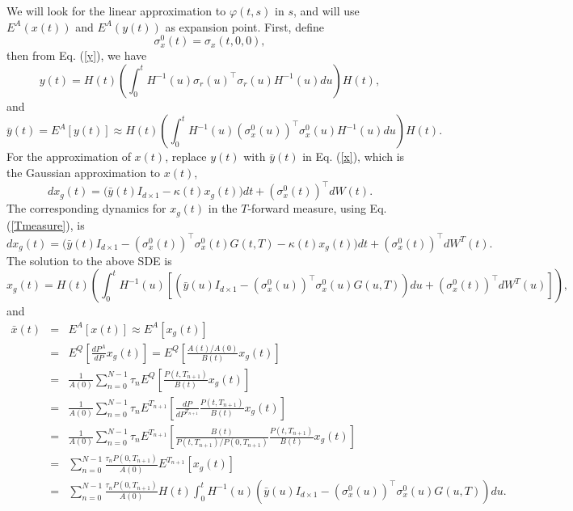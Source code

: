 \documentclass[12pt]{article}
\begin{document}
    We will look for the linear approximation to $\varphi(t,s)$ in $s$, and will use $E^A(x(t))$ and $E^A(y(t))$
    as expansion point. First, define
    \begin{equation}
      \sigma_x^0(t)=\sigma_x(t,0,0),
    \end{equation}
    then from Eq. (\ref{y}), we have
    \begin{equation}
      y(t)=H(t)\left(\int_0^tH^{-1}(u)\sigma_r(u)^{\top}\sigma_r(u)H^{-1}(u)du\right)H(t),
    \end{equation}
    and
    \begin{equation}
      \bar{y}(t)= E^A\left[y(t)\right] \approx H(t)\left(\int_0^tH^{-1}(u)\left(\sigma_x^0(u)\right)^{\top}\sigma_x^0(u)H^{-1}(u)du\right)H(t).
    \end{equation}
    For the approximation of $x(t)$, replace $y(t)$ with $\bar{y}(t)$ in Eq. (\ref{x}), which is the Gaussian approximation
    to $x(t)$,
    \begin{equation}
      dx_g(t)=\bigg(\bar{y}(t)I_{d \times 1}-\kappa(t)x_g(t)\bigg)dt+\left(\sigma_x^0(t)\right)^{\top}dW(t).
    \end{equation}
    The corresponding dynamics for $x_g(t)$ in the $T$-forward measure, using Eq. (\ref{Tmeasure}), is
    \begin{equation}
      dx_g(t)=\bigg(\bar{y}(t)I_{d \times 1}-\left(\sigma_x^0(t)\right)^{\top}\sigma_x^0(t)G(t,T)-\kappa(t)x_g(t)\bigg)dt
                                        +\left(\sigma_x^0(t)\right)^{\top}dW^T(t).
    \end{equation}
    The solution to the above SDE is
    \begin{equation}
      x_g(t)=H(t)\left(\int_0^tH^{-1}(u)\left[\left(\bar{y}(u)I_{d \times 1}-\left(\sigma_x^0(u)\right)^{\top}\sigma_x^0(u)G(u,T)\right)du
                        +\left(\sigma_x^0(t)\right)^{\top}dW^T(u)\right]\right),
    \end{equation}
    and
    \begin{eqnarray}
      \bar{x}(t) &=& E^A\left[x(t)\right]\approx E^A\left[x_g(t)\right]\nonumber\\
                 &=& E^Q\left[\frac{dP^A}{dP}x_g(t)\right] = E^Q\left[\frac{A(t)/A(0)}{B(t)}x_g(t)\right]\nonumber\\
                 &=& \frac{1}{A(0)}\sum_{n=0}^{N-1}\tau_n E^Q\left[\frac{P(t,T_{n+1})}{B(t)}x_g(t)\right]\nonumber\\
                 &=& \frac{1}{A(0)}\sum_{n=0}^{N-1}\tau_n E^{T_{n+1}}\left[\frac{dP}{dP^{T_{n+1}}}\frac{P(t,T_{n+1})}{B(t)}x_g(t)\right]\nonumber\\
                 &=& \frac{1}{A(0)}\sum_{n=0}^{N-1}\tau_n E^{T_{n+1}}\left[\frac{B(t)}{P(t,T_{n+1})/P(0,T_{n+1})}\frac{P(t,T_{n+1})}{B(t)}x_g(t)\right]\nonumber\\
                 &=& \sum_{n=0}^{N-1}\frac{\tau_nP(0,T_{n+1})}{A(0)}E^{T_{n+1}}\left[x_g(t)\right]\nonumber\\
                 &=& \sum_{n=0}^{N-1}\frac{\tau_nP(0,T_{n+1})}{A(0)}H(t)
                      \int_0^tH^{-1}(u)\left(\bar{y}(u)I_{d \times 1}-\left(\sigma_x^0(u)\right)^{\top}\sigma_x^0(u)G(u,T)\right)du.
    \end{eqnarray}
\end{document}
